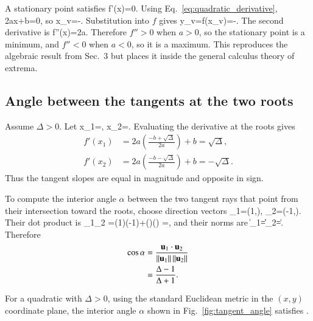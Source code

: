 A stationary point satisfies
\be
f'(x)=0.
\ee
Using Eq.~\eqref{eq:quadratic_derivative},
\be
2ax+b=0,
\ee
so
\be
x_v=-.
\ee
Substitution into $f$ gives
\be
 y_v=f(x_v)=-.
\ee
The second derivative is
\be
f''(x)=2a.
\ee
Therefore $f''>0$ when $a>0$, so the stationary point is a minimum, and $f''<0$ when $a<0$, so it is a maximum. This reproduces the algebraic result from Sec.~3 but places it inside the general calculus theory of extrema.

\subsection{Angle between the tangents at the two roots}

Assume $\Delta>0$. Let
\be
x_1=,
\qquad
x_2=.
\ee
Evaluating the derivative at the roots gives
\begin{align}
f'(x_1)
&=2a\left(\frac{-b+\sqrt{\Delta}}{2a}\right)+b
=\sqrt{\Delta},\\
f'(x_2)
&=2a\left(\frac{-b-\sqrt{\Delta}}{2a}\right)+b
=-\sqrt{\Delta}.
\end{align}
Thus the tangent slopes are equal in magnitude and opposite in sign.

To compute the interior angle $\alpha$ between the two tangent rays that point from their intersection toward the roots, choose direction vectors
\be
{}_1=(1,\sqrt{\Delta}),
\qquad
{}_2=(-1,\sqrt{\Delta}).
\ee
Their dot product is
\be
{}_1\cdot{}_2
=(1)(-1)+(\sqrt{\Delta})(\sqrt{\Delta})
=,
\ee
and their norms are
\be
\|_1\|=\|_2\|=.
\ee
Therefore
\begin{align}
\cos\alpha
&=\frac{\mathbf{u}_1\cdot\mathbf{u}_2}
{\|\mathbf{u}_1\|\,\|\mathbf{u}_2\|}\\
&=\frac{\Delta-1}{\Delta+1}.
\lb{eq:tangent_angle}
\end{align}

\begin{proposition}
For a quadratic with $\Delta>0$, using the standard Euclidean metric in the $(x,y)$ coordinate plane, the interior angle $\alpha$ shown in Fig.~\ref{fig:tangent_angle} satisfies
\be
{}.
\ee
\end{proposition}

